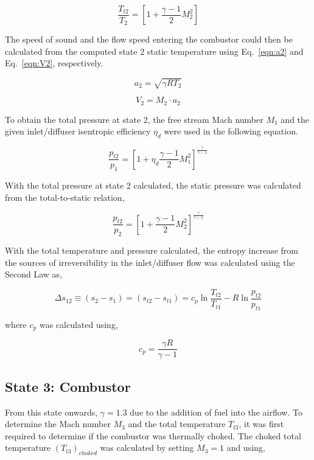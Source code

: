 \documentclass[conf]{new-aiaa} %
\begin{document}
\begin{equation}
    \label{eqn:T2}
    \frac{T_{t2}}{T_2}=\left[1+\frac{\gamma-1}{2}M_2^2\right]
\end{equation}

The speed of sound and the flow speed entering the combustor could then be calculated from the computed state 2 static temperature using Eq.~\eqref{eqn:a2} and Eq.~\eqref{eqn:V2}, respectively.

\begin{equation}
    \label{eqn:a2}
    a_2=\sqrt{\gamma R T_2}
\end{equation}

\begin{equation}
    \label{eqn:V2}
    V_2=M_2\cdot a_2
\end{equation}

To obtain the total pressure at state 2, the free stream Mach number $M_1$ and the given inlet/diffuser isentropic efficiency $\eta_d$ were used in the following equation.

\begin{equation}
    \label{eqn:pt2}
    \frac{p_{t2}}{p_1}=\left[1+\eta_d\frac{\gamma-1}{2}M_1^2\right]^{\frac{\gamma}{\gamma-1}}
\end{equation}

With the total pressure at state 2 calculated, the static pressure was calculated from the total-to-static relation,

\begin{equation}
    \label{eqn:p2}
    \frac{p_{t2}}{p_2}=\left[1+\frac{\gamma-1}{2}M_2^2\right]^{\frac{\gamma}{\gamma-1}}
\end{equation}

With the total temperature and pressure calculated, the entropy increase from the sources of irreversibility in the inlet/diffuser flow was calculated using the Second Law as,

\begin{equation}
    \label{eqn:dels12}
    \Delta s_{12}\equiv \left(s_2-s_1\right)=\left(s_{t2}-s_{t1}\right)=c_p \ln\frac{T_{t2}}{T_{t1}}-R\ln\frac{p_{t2}}{p_{t1}}
\end{equation}

where $c_p$ was calculated using,

\begin{equation}
    \label{eqn:cp}
    c_p=\frac{\gamma R}{\gamma-1}
\end{equation}

\subsection{State 3: Combustor}
From this state onwards, $\gamma=1.3$ due to the addition of fuel into the airflow. To determine the Mach number $M_3$ and the total temperature $T_{t3}$, it was first required to determine if the combustor was thermally choked. The choked total temperature $\left(T_{t3}\right)_{choked}$ was calculated by setting $M_3=1$ and using,
\end{document}
